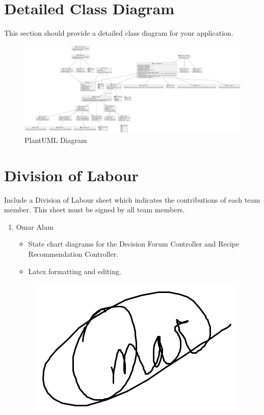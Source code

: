 \documentclass[]{article}
\begin{document}

\clearpage
\section{Detailed Class Diagram}
\label{sec:detailed_class_diagram}
This section should provide a detailed class diagram for your application.
\begin{figure}[h]
    \centering
    \includegraphics[width=\textwidth]{DetailedClassDiagram4.pdf}
    \caption{PlantUML Diagram}
\end{figure}

\clearpage
\appendix
\section{Division of Labour}
\label{sec:division_of_labour}
Include a Division of Labour sheet which indicates the contributions of each team member. This sheet must be signed by all team members.
\begin{enumerate}
    \item Omar Alam
    \begin{itemize}
        \item State chart diagrams for the Decision Forum Controller and Recipe Recommendation Controller.
        \item Latex formatting and editing.
    \end{itemize}
    \begin{figure}[H]
        \includegraphics[scale=0.4]{omar-signature.png}
    \end{figure}
\end{enumerate}


\newpage
\end{document}
